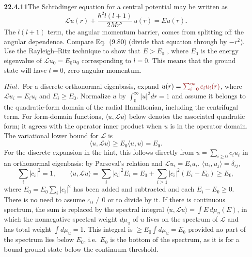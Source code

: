 \par\bigskip
\noindent\textbf{22.4.11}\quad The Schr\"odinger equation for a
central potential may be written as
\[
\mathcal{L}u(r)+\frac{\hbar^{2}l(l+1)}{2Mr^{2}}\,u(r)=Eu(r).
\]
The $l(l+1)$ term, the angular momentum barrier, comes from
splitting off the angular dependence. Compare Eq.~(9.80) (divide
that equation through by $-r^{2}$). Use the Rayleigh--Ritz
technique to show that $E>E_{0}$ , where $E_{0}$ is the  energy
eigenvalue of $\mathcal{L}u_{0}=E_{0}u_{0}$ corresponding to
$l=0$. This means that the ground state will have $l=0$, zero
angular momentum.
\par\emph{Hint.}~For a discrete orthonormal eigenbasis, expand
$u(r)=\erratum{\sum_{i=0}^{\infty}c_i u_i(r)}$, where
$\mathcal{L}u_i=E_i u_i$ and $E_i\ge E_0$.
\solution
{}
Normalize $u$ by $\int_0^\infty|u|^2dr=1$ and assume it belongs to the
quadratic-form domain of the radial Hamiltonian, including the
centrifugal term. For form-domain functions,
$\langle u,\mathcal Lu\rangle$ below denotes the associated quadratic form;
it agrees with the operator inner product when $u$ is in the operator
domain. The variational lower bound for $\mathcal L$ is
\[
 \langle u,\mathcal Lu\rangle\ge E_0\langle u,u\rangle=E_0.
\]
For the discrete expansion in the hint, this follows directly from
$u=\sum_{i\ge0}c_i u_i$ in an orthonormal eigenbasis: by Parseval's
relation and $\mathcal Lu_i=E_iu_i$, $\langle u_i,u_j\rangle=\delta_{ij}$,
\[
 \sum_i|c_i|^2=1,\qquad
 \langle u,\mathcal Lu\rangle
 =\sum_i|c_i|^2E_i
 =E_0+\sum_{i\ge1}|c_i|^2(E_i-E_0)\ge E_0,
\]
where $E_0=E_0\sum_i|c_i|^2$ has been added and subtracted and each
$E_i-E_0\ge0$.
There is no need to assume $c_0\ne0$ or to divide by it.  If there
is continuous spectrum, the sum is replaced by the spectral integral
$\langle u,\mathcal Lu\rangle=\int E\,d\mu_u(E)$, in which the
nonnegative spectral weight $d\mu_u$ of $u$ lives on the spectrum of
$\mathcal L$ and has total weight $\int d\mu_u=1$. This integral is
$\ge E_0\int d\mu_u=E_0$ provided no part of the spectrum lies below
$E_0$, i.e.\ $E_0$ is the
bottom of the spectrum, as it is for a bound ground state below the
continuum threshold.

